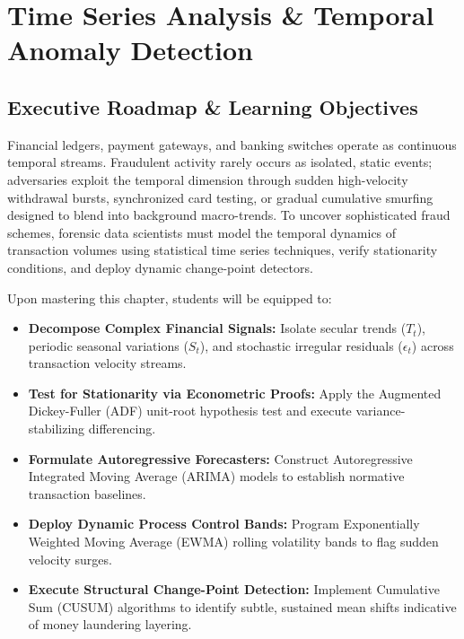 \chapter{Time Series Analysis \& Temporal Anomaly Detection}

\section{Executive Roadmap \& Learning Objectives}

Financial ledgers, payment gateways, and banking switches operate as continuous temporal streams. Fraudulent activity rarely occurs as isolated, static events; adversaries exploit the temporal dimension through sudden high-velocity withdrawal bursts, synchronized card testing, or gradual cumulative smurfing designed to blend into background macro-trends. To uncover sophisticated fraud schemes, forensic data scientists must model the temporal dynamics of transaction volumes using statistical time series techniques, verify stationarity conditions, and deploy dynamic change-point detectors.

\begin{tcolorbox}[colback=primarylight, colframe=primarydark, title={\textbf{Core Learning Competencies}}]
Upon mastering this chapter, students will be equipped to:
\begin{itemize}
    \item \textbf{Decompose Complex Financial Signals:} Isolate secular trends ($T_t$), periodic seasonal variations ($S_t$), and stochastic irregular residuals ($\epsilon_t$) across transaction velocity streams.
    \item \textbf{Test for Stationarity via Econometric Proofs:} Apply the Augmented Dickey-Fuller (ADF) unit-root hypothesis test and execute variance-stabilizing differencing.
    \item \textbf{Formulate Autoregressive Forecasters:} Construct Autoregressive Integrated Moving Average (ARIMA) models to establish normative transaction baselines.
    \item \textbf{Deploy Dynamic Process Control Bands:} Program Exponentially Weighted Moving Average (EWMA) rolling volatility bands to flag sudden velocity surges.
    \item \textbf{Execute Structural Change-Point Detection:} Implement Cumulative Sum (CUSUM) algorithms to identify subtle, sustained mean shifts indicative of money laundering layering.
\end{itemize}
\end{tcolorbox}

